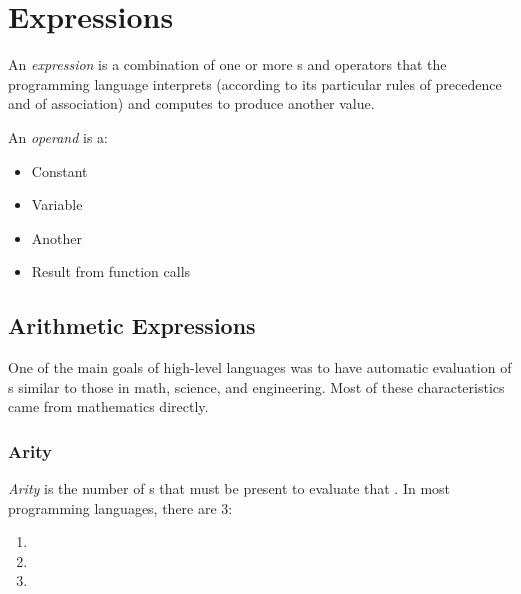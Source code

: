 \section{Expressions}\label{sec:Expressions}
\begin{definition}[Expression]\label{def:Expression}
  An \emph{expression} is a combination of one or more s and operators that the programming language interprets (according to its particular rules of precedence and of association) and computes to produce another value.
\end{definition}

\begin{definition}[Operand]\label{def:Operand}
  An \emph{operand} is a:
  \begin{itemize}[noitemsep]
  \item Constant
  \item Variable
  \item Another 
  \item Result from function calls
  \end{itemize}
\end{definition}

\subsection{Arithmetic Expressions}\label{subsec:Arithmetic_Expressions}
One of the main goals of high-level languages was to have automatic evaluation of s similar to those in math, science, and engineering.
Most of these characteristics came from mathematics directly.

\subsubsection{Arity}\label{subsubsec:Operator_Arity} %
\begin{definition}[Arity]\label{def:Arity}
  \emph{Arity} is the number of s that must be present to evaluate that .
  In most programming languages, there are 3:
  \begin{enumerate}[noitemsep]
  \item {}
  \item {}
  \item {}
  \end{enumerate}
\end{definition}

